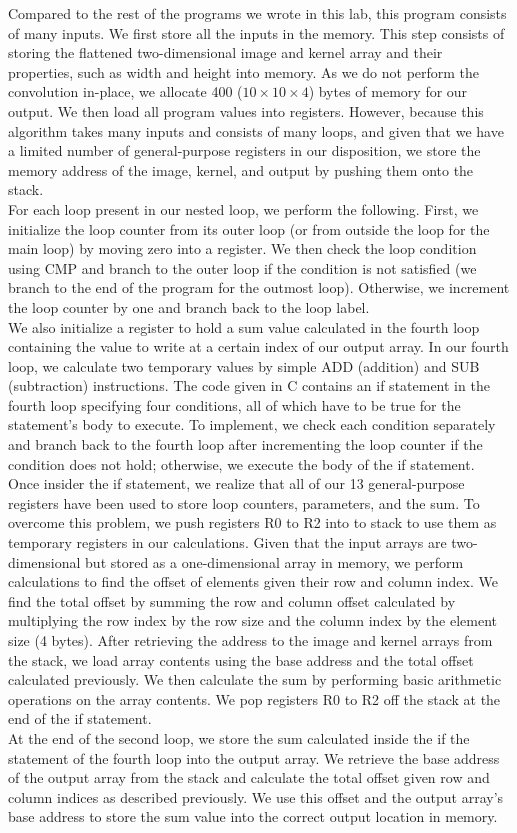 \documentclass[10pt]{article}
\begin{document}
Compared to the rest of the programs we wrote in this lab, this program consists of many inputs. We first store all the inputs in the memory. This step consists of storing the flattened two-dimensional image and kernel array and their properties, such as width and height into memory. As we do not perform the convolution in-place, we allocate 400 ($10\times10\times4$) bytes of memory for our output. We then load all program values into registers. However, because this algorithm takes many inputs and consists of many loops, and given that we have a limited number of general-purpose registers in our disposition, we store the memory address of the image, kernel, and output by pushing them onto the stack.\\
For each loop present in our nested loop, we perform the following. First, we initialize the loop counter from its outer loop (or from outside the loop for the main loop) by moving zero into a register. We then check the loop condition using CMP and branch to the outer loop if the condition is not satisfied (we branch to the end of the program for the outmost loop). Otherwise, we increment the loop counter by one and branch back to the loop label.\\
We also initialize a register to hold a sum value calculated in the fourth loop containing the value to write at a certain index of our output array. In our fourth loop, we calculate two temporary values by simple ADD (addition) and SUB (subtraction) instructions. The code given in C contains an if statement in the fourth loop specifying four conditions, all of which have to be true for the statement's body to execute. To implement, we check each condition separately and branch back to the fourth loop after incrementing the loop counter if the condition does not hold; otherwise, we execute the body of the if statement.\\
Once insider the if statement, we realize that all of our 13 general-purpose registers have been used to store loop counters, parameters, and the sum. To overcome this problem, we push registers R0 to R2 into to stack to use them as temporary registers in our calculations. Given that the input arrays are two-dimensional but stored as a one-dimensional array in memory, we perform calculations to find the offset of elements given their row and column index. We find the total offset by summing the row and column offset calculated by multiplying the row index by the row size and the column index by the element size (4 bytes). After retrieving the address to the image and kernel arrays from the stack, we load array contents using the base address and the total offset calculated previously. We then calculate the sum by performing basic arithmetic operations on the array contents. We pop registers R0 to R2 off the stack at the end of the if statement.\\
At the end of the second loop, we store the sum calculated inside the if the statement of the fourth loop into the output array. We retrieve the base address of the output array from the stack and calculate the total offset given row and column indices as described previously. We use this offset and the output array's base address to store the sum value into the correct output location in memory.\\
\end{document}
